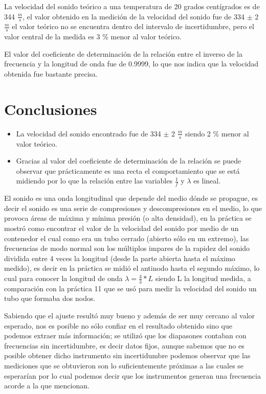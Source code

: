 \documentclass[10pt,a4paper]{article}
\begin{document}
La velocidad del sonido teórico a una temperatura de 20 grados centígrados es de 344 $\frac{m}{s}$, el valor obtenido en la medición de la velocidad del sonido fue de 334 $\pm$ 2 $\frac{m}{s}$ el valor teórico no se encuentra dentro del intervalo de incertidumbre, pero el valor central de la medida es 3 $\%$ menor al valor teórico.

El valor del coeficiente de determinación de la relación entre el inverso de la frecuencia y la longitud de onda fue de 0.9999, lo que nos indica que la velocidad obtenida fue bastante precisa.

\section{Conclusiones}

\begin{itemize}
    \item La velocidad del sonido encontrado fue de 334 $\pm$ 2 $\frac{m}{s}$ siendo 2 $\%$ menor al valor teórico.
    \item Gracias al valor del coeficiente de determinación de la relación se puede observar que prácticamente es una recta el comportamiento que se está midiendo por lo que la relación entre las variables $\frac{1}{f}$ y $\lambda$ es lineal.
    \end{itemize}
El sonido es una onda longitudinal que depende del medio dónde se propague, es decir el sonido es una serie de compresiones y descompresiones en el medio, lo que provoca áreas de máxima y mínima presión (o alta densidad), en la práctica se mostró como encontrar el valor de la velocidad del sonido por medio de un contenedor el cual como era un tubo cerrado (abierto sólo en un
extremo), las frecuencias de modo normal son los múltiplos
impares de la rapidez del sonido dividida entre 4 veces la longitud (desde la parte abierta hasta el máximo medido), es decir en la práctica se midió el antinodo hasta el segundo máximo, lo cual para conocer la longitud de onda $\lambda= \frac{4}{3}*L$ siendo L la longitud medida,  a comparación con la práctica 11 que se usó para medir la velocidad del sonido un tubo que formaba dos nodos. 

Sabiendo que el ajuste resultó muy bueno y además de ser muy cercano al valor esperado, nos es posible no sólo confiar en el resultado obtenido sino que podemos extraer más información; se utilizó que los diapasones contaban con frecuencias sin incertidumbre, es decir datos fijos, aunque sabemos que no es posible obtener dicho instrumento sin incertidumbre podemos observar que las mediciones que se obtuvieron son lo suficientemente próximas a las cuales se esperarían por lo cual podemos decir que los instrumentos generan una frecuencia acorde a la que mencionan. 
\end{document}
